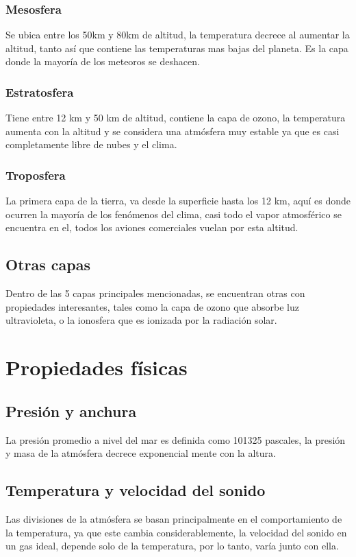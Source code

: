 \documentclass[11pt]{article}
\begin{document}
        \subsubsection{Mesosfera}
        Se ubica entre los 50km y 80km de altitud, la temperatura decrece al aumentar la altitud, tanto así que contiene las temperaturas mas bajas del planeta. Es la capa donde la mayoría de los meteoros se deshacen.
        
        \subsubsection{Estratosfera}
        Tiene entre 12 km y 50 km de altitud, contiene la capa de ozono, la temperatura aumenta con la altitud y se considera una atmósfera muy estable ya que es casi completamente libre de nubes y el clima.
	
    	\subsubsection{Troposfera}
        La primera capa de la tierra, va desde la superficie hasta los 12 km, aquí es donde ocurren la mayoría de los fenómenos del clima, casi todo el vapor atmosférico se encuentra en el, todos los aviones comerciales vuelan por esta altitud.
    
    \subsection{Otras capas}
    Dentro de las 5 capas principales mencionadas, se encuentran otras con propiedades interesantes, tales como la capa de ozono que absorbe luz ultravioleta, o la ionosfera que es ionizada por la radiación solar.


\section{Propiedades físicas}

	\subsection{Presión y anchura}
    La presión promedio a nivel del mar es definida como 101325 pascales, la presión y masa de la atmósfera decrece exponencial mente con la altura.
    
    \subsection{Temperatura y velocidad del sonido}
    Las divisiones de la atmósfera se basan principalmente en el comportamiento de la temperatura, ya que este cambia considerablemente, la velocidad del sonido en un gas ideal, depende solo de la temperatura, por lo tanto, varía junto con ella.
    
\end{document}
